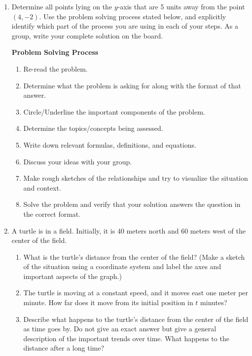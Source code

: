 \begin{enumerate}
\clearpage

\item Determine all points lying on the $y$-axis that are 5 units away
  from the point $(4,-2)$.  Use the problem solving process stated
  below, and explicitly identify which part of the process you are
  using in each of your steps.  As a group, write your complete
  solution on the board.


\begin{boxthm}
{\bf Problem Solving Process}
\begin{enumerate}
\item Re-read the problem.
\item Determine what the problem is asking for along with the format of that answer.
\item Circle/Underline the important components of the problem.
\item Determine the topics/concepts being assessed.
\item Write down relevant formulas, definitions, and equations.
\item Discuss your ideas with your group.
\item Make rough sketches of the relationships and try to visualize
  the situation and context.
\item Solve the problem and verify that your solution answers the
  question in the correct format.
\end{enumerate}

\end{boxthm}
\vfill
\clearpage

\item A turtle is in a field. Initially, it is 40 meters north and 60
  meters west of the center of the field.
  \begin{enumerate}
  \item What is the turtle's distance from the center of the field?
    (Make a sketch of the situation using a coordinate system and
    label the axes and important aspects of the graph.)

    \vfill
    \vfill
    
  \item The turtle is moving at a constant speed, and it moves east
    one meter per minute. How far does it move from its initial
    position in $t$ minutes?
    
    \vfill
    
  \item Describe what happens to the turtle's distance from the center
    of the field as time goes by. Do not give an exact answer but give
    a general description of the important trends over time. What
    happens to the distance after a long time?
    

\end{enumerate}
\end{enumerate}
